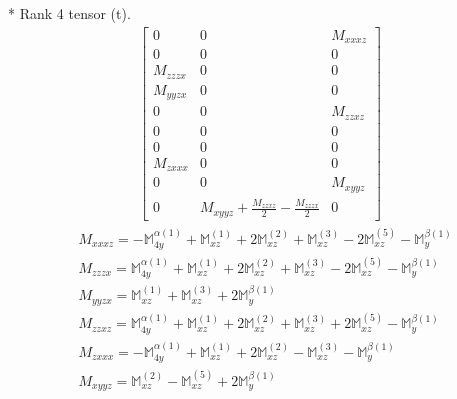 \documentclass[fleqn,8pt,landscape]{jsarticle}
\begin{document}
* Rank 4 tensor (t).
\begin{align*}
\begin{bmatrix} 0 & 0 & M_{xxxz} \\ 0 & 0 & 0 \\ M_{zzzx} & 0 & 0 \\ M_{yyzx} & 0 & 0 \\ 0 & 0 & M_{zzxz} \\ 0 & 0 & 0 \\ 0 & 0 & 0 \\ M_{zxxx} & 0 & 0 \\ 0 & 0 & M_{xyyz} \\ 0 & M_{xyyz} + \frac{M_{zzxz}}{2} - \frac{M_{zzzx}}{2} & 0 \end{bmatrix}
\end{align*}
\begin{align*}
& M_{xxxz} = - \mathbb{M}_{4y}^{\alpha(1)} + \mathbb{M}_{xz}^{(1)} + 2 \mathbb{M}_{xz}^{(2)} + \mathbb{M}_{xz}^{(3)} - 2 \mathbb{M}_{xz}^{(5)} - \mathbb{M}_{y}^{\beta(1)} \\
& M_{zzzx} = \mathbb{M}_{4y}^{\alpha(1)} + \mathbb{M}_{xz}^{(1)} + 2 \mathbb{M}_{xz}^{(2)} + \mathbb{M}_{xz}^{(3)} - 2 \mathbb{M}_{xz}^{(5)} - \mathbb{M}_{y}^{\beta(1)} \\
& M_{yyzx} = \mathbb{M}_{xz}^{(1)} + \mathbb{M}_{xz}^{(3)} + 2 \mathbb{M}_{y}^{\beta(1)} \\
& M_{zzxz} = \mathbb{M}_{4y}^{\alpha(1)} + \mathbb{M}_{xz}^{(1)} + 2 \mathbb{M}_{xz}^{(2)} + \mathbb{M}_{xz}^{(3)} + 2 \mathbb{M}_{xz}^{(5)} - \mathbb{M}_{y}^{\beta(1)} \\
& M_{zxxx} = - \mathbb{M}_{4y}^{\alpha(1)} + \mathbb{M}_{xz}^{(1)} + 2 \mathbb{M}_{xz}^{(2)} - \mathbb{M}_{xz}^{(3)} - \mathbb{M}_{y}^{\beta(1)} \\
& M_{xyyz} = \mathbb{M}_{xz}^{(2)} - \mathbb{M}_{xz}^{(5)} + 2 \mathbb{M}_{y}^{\beta(1)}
\end{align*}
\end{document}
